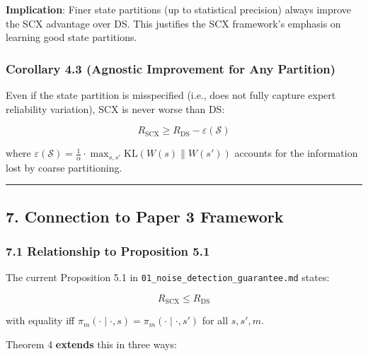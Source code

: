 \documentclass[
  12pt,
]{ctexart}
\begin{document}
\textbf{Implication}: Finer state partitions (up to statistical
precision) always improve the SCX advantage over DS. This justifies the
SCX framework's emphasis on learning good state partitions.

\subsubsection{Corollary 4.3 (Agnostic Improvement for Any
Partition)}\label{corollary-4.3-agnostic-improvement-for-any-partition}

Even if the state partition is misspecified (i.e., does not fully
capture expert reliability variation), SCX is never worse than DS:

\[R_{\text{SCX}} \geq R_{\text{DS}} - \varepsilon(\mathcal{S})\]

where
\(\varepsilon(\mathcal{S}) = \frac{1}{\alpha} \cdot \max_{s,s'} \text{KL}(W(s) \parallel W(s'))\)
accounts for the information lost by coarse partitioning.

\begin{center}\rule{0.5\linewidth}{0.5pt}\end{center}

\subsection{7. Connection to Paper 3
Framework}\label{connection-to-paper-3-framework}

\subsubsection{7.1 Relationship to Proposition
5.1}\label{relationship-to-proposition-5.1}

The current Proposition 5.1 in
\texttt{01\_noise\_detection\_guarantee.md} states:

\[R_{\text{SCX}} \leq R_{\text{DS}}\]

with equality iff
\(\pi_m(\cdot \mid \cdot, s) = \pi_m(\cdot \mid \cdot, s')\) for all
\(s, s', m\).

Theorem 4 \textbf{extends} this in three ways:
\end{document}
